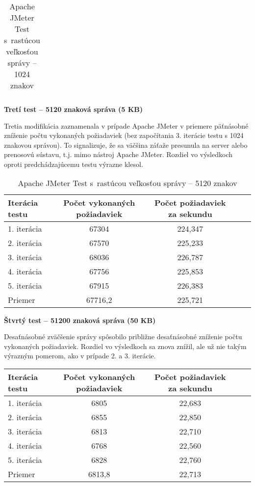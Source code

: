 \documentclass[12pt,oneside,final]{fithesis-utf8}
\begin{document}
\begin{itemize}
\begin{table}[H]
\begin{center}
\begin{tabular}{ | l | c | c | c | c |}
\end{tabular}
\end{center}
\caption{Apache JMeter Test s~rastúcou veľkosťou správy -- 1024 znakov}
\end{table}


\textbf{Tretí test -- 5120 znaková správa (5 KB)}

Tretia modifikácia zaznamenala v prípade Apache JMeter v priemere päťnásobné zníženie počtu vykonaných požiadaviek (bez započítania 3. iterácie testu s 1024 znakovou správou). To signalizuje, že sa väčšina záťaže presunula na server alebo prenosovú sústavu, t.j. mimo nástroj Apache JMeter. Rozdiel vo výsledkoch oproti predchádzajúcemu testu výrazne klesol.

\begin{table}[H]
\begin{center}
\begin{tabular}{ | l | c | c | c | c |}
		\hline
		 \textbf{Iterácia testu} & \textbf{Počet vykonaných požiadaviek} & \textbf{Počet požiadaviek za sekundu} \\ \hline
		 1. iterácia & 67304 & 224,347 \\ \hline
		 2. iterácia & 67570 & 225,233 \\ \hline
		 3. iterácia & 68036 & 226,787 \\ \hline
		 4. iterácia & 67756 & 225,853 \\ \hline
		 5. iterácia & 67915 & 226,383 \\ \hline
		 Priemer & 67716,2 & 225,721 \\ \hline
		 
\end{tabular}
\end{center}
\caption{Apache JMeter Test s~rastúcou veľkosťou správy -- 5120 znakov}
\end{table}


\textbf{Štvrtý test -- 51200 znaková správa (50 KB)}

Desaťnásobné zväčšenie správy spôsobilo približne desaťnásobné zníženie počtu vykonaných požiadaviek. Rozdiel vo výsledkoch sa znova znížil, ale už nie takým výrazným pomerom, ako v prípade 2. a 3. iterácie.

\begin{table}[H]
\begin{center}
\begin{tabular}{ | l | c | c | c | c |}
		\hline
		 \textbf{Iterácia testu} & \textbf{Počet vykonaných požiadaviek} & \textbf{Počet požiadaviek za sekundu} \\ \hline
		 1. iterácia & 6805 & 22,683 \\ \hline
		 2. iterácia & 6855 & 22,850 \\ \hline
		 3. iterácia & 6813 & 22,710 \\ \hline
		 4. iterácia & 6768 & 22,560 \\ \hline
		 5. iterácia & 6828 & 22,760 \\ \hline
		 Priemer & 6813,8 & 22,713 \\ \hline
		 

\end{tabular}
\end{center}
\end{table}
\end{itemize}
\end{document}
